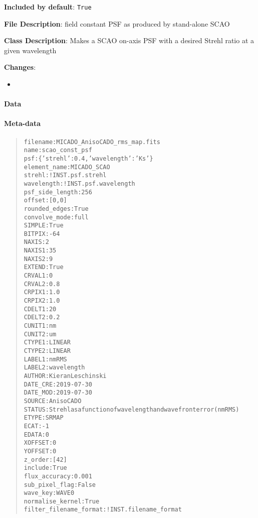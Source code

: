 \textbf{Included by default}: \texttt{True}

\textbf{File Description}: field constant PSF as produced by stand-alone SCAO

\textbf{Class Description}: Makes a SCAO on-axis PSF with a desired Strehl ratio at a given wavelength

\textbf{Changes}:

\begin{itemize}
\item \end{itemize}


\paragraph{Data%
  \label{id1}%
}


\paragraph{Meta-data%
  \label{id2}%
}

\begin{quote}
\begin{alltt}
              filename : MICADO_AnisoCADO_rms_map.fits
                  name : scao_const_psf
                   psf : \{'strehl': 0.4, 'wavelength': 'Ks'\}
          element_name : MICADO_SCAO
                strehl : !INST.psf.strehl
            wavelength : !INST.psf.wavelength
       psf_side_length : 256
                offset : [0, 0]
         rounded_edges : True
         convolve_mode : full
                SIMPLE : True
                BITPIX : -64
                 NAXIS : 2
                NAXIS1 : 35
                NAXIS2 : 9
                EXTEND : True
                CRVAL1 : 0
                CRVAL2 : 0.8
                CRPIX1 : 1.0
                CRPIX2 : 1.0
                CDELT1 : 20
                CDELT2 : 0.2
                CUNIT1 : nm
                CUNIT2 : um
                CTYPE1 : LINEAR
                CTYPE2 : LINEAR
                LABEL1 : nmRMS
                LABEL2 : wavelength
                AUTHOR : Kieran Leschinski
              DATE_CRE : 2019-07-30
              DATE_MOD : 2019-07-30
                SOURCE : AnisoCADO
                STATUS : Strehl as a function of wavelength and wavefront error (nmRMS)
                 ETYPE : SRMAP
                  ECAT : -1
                 EDATA : 0
               XOFFSET : 0
               YOFFSET : 0
               z_order : [42]
               include : True
         flux_accuracy : 0.001
        sub_pixel_flag : False
              wave_key : WAVE0
      normalise_kernel : True
filter_filename_format : !INST.filename_format
\end{alltt}
\end{quote}
